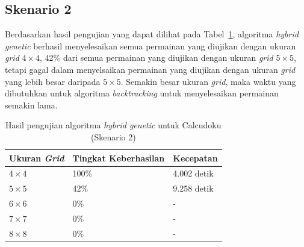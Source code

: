 \subsection{Skenario 2}
\label{sec:skenario2}

Berdasarkan hasil pengujian yang dapat dilihat pada Tabel~\ref{tab:pengujianhg2}, algoritma \textit{hybrid genetic} berhasil menyelesaikan semua permainan yang diujikan dengan ukuran \textit{grid} \begin{math}4 \times 4\end{math}, 42\% dari semua permainan yang diujikan dengan ukuran \textit{grid} \begin{math}5 \times 5\end{math}, tetapi gagal dalam menyelsaikan permainan yang diujikan dengan ukuran \textit{grid} yang lebih besar daripada \begin{math}5 \times 5\end{math}. Semakin besar ukuran \textit{grid}, maka waktu yang dibutuhkan untuk algoritma \textit{backtracking} untuk menyelesaikan permainan semakin lama.

\begin{table}
\centering
\captionsetup{justification=centering}
\caption[Hasil pengujian algoritma \textit{hybrid genetic} untuk Calcudoku (Skenario 2)]{Hasil pengujian algoritma \textit{hybrid genetic} untuk Calcudoku (Skenario 2)}
\begin{tabular}{| l | l | l |}
\hline
Ukuran \textit{Grid} & Tingkat Keberhasilan & Kecepatan \\
\hline \hline
\begin{math}4 \times 4\end{math} & 100\% & 4.002 detik \\
\hline
\begin{math}5 \times 5\end{math} & 42\% & 9.258 detik \\
\hline
\begin{math}6 \times 6\end{math} & 0\% & - \\
\hline
\begin{math}7 \times 7\end{math} & 0\% & - \\
\hline
\begin{math}8 \times 8\end{math} & 0\% & - \\
\hline
\end{tabular}
\label{tab:pengujianhg2}
\end{table}

